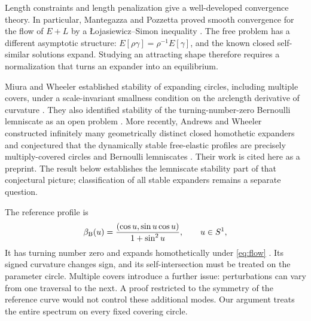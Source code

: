 Length constraints and length penalization give a well-developed convergence theory. In particular, Mantegazza and Pozzetta proved smooth convergence for the flow of $E+L$ by a \L{}ojasiewicz--Simon inequality \cite[Theorem~1.2]{MP}. The free problem has a different asymptotic structure: $E[\rho\gamma]=\rho^{-1}E[\gamma]$, and the known closed self-similar solutions expand. Studying an attracting shape therefore requires a normalization that turns an expander into an equilibrium.

Miura and Wheeler established stability of expanding circles, including multiple covers, under a scale-invariant smallness condition on the arclength derivative of curvature \cite[Theorem~1.2]{MW}. They also identified stability of the turning-number-zero Bernoulli lemniscate as an open problem \cite[Section~1.2]{MW}. More recently, Andrews and Wheeler constructed infinitely many geometrically distinct closed homothetic expanders and conjectured that the dynamically stable free-elastic profiles are precisely multiply-covered circles and Bernoulli lemniscates \cite[Theorem~1.1 and Conjecture~1.4]{Jellyfish}. Their work is cited here as a preprint. The result below establishes the lemniscate stability part of that conjectural picture; classification of all stable expanders remains a separate question.

The reference profile is
\begin{equation}\label{eq:beta}
 \beta_{\rm B}(u)=\frac{(\cos u,\sin u\cos u)}{1+\sin^2u},\qquad u\in S^1,
\end{equation}
It has turning number zero and expands homothetically under \eqref{eq:flow} \cite[Section~2.2.3]{MW}. Its signed curvature changes sign, and its self-intersection must be treated on the parameter circle. Multiple covers introduce a further issue: perturbations can vary from one traversal to the next. A proof restricted to the symmetry of the reference curve would not control these additional modes. Our argument treats the entire spectrum on every fixed covering circle.


